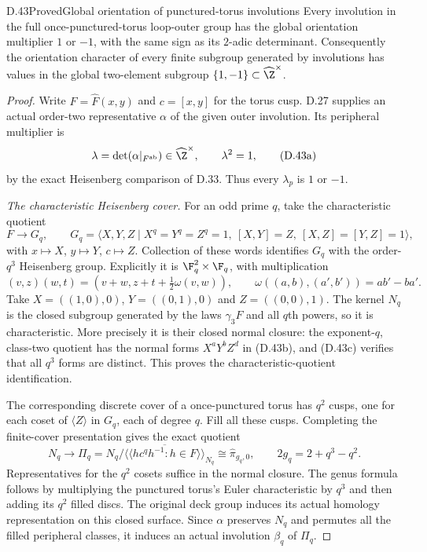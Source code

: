\begin{claim}{D.43}{Proved}{Global orientation of punctured-torus involutions}
Every involution in the full once-punctured-torus loop-outer
group has the global orientation multiplier $1$ or $-1$,
with the same sign as its $2$-adic determinant.
Consequently the orientation character of every finite
subgroup generated by involutions has values in the global
two-element subgroup $\{1,-1\}\subset\widehat\Z^\times$.
\end{claim}
\begin{proof}
Write $F=\widehat F(x,y)$ and $c=[x,y]$ for the torus
cusp.  D.27 supplies an actual order-two representative
$\alpha$ of the given outer involution.  Its peripheral
multiplier is
\[
 \lambda=\det(\alpha|_{F^{\rm ab}})\in\widehat\Z^\times,
                    \qquad \lambda^2=1,
                                                        \tag{D.43a}
\]
by the exact Heisenberg comparison of D.33.
Thus every $\lambda_p$ is $1$ or $-1$.

\emph{The characteristic Heisenberg cover.}
For an odd prime $q$, take the characteristic quotient
\[
 F\longrightarrow G_q,\qquad
 G_q=\langle X,Y,Z\mid X^q=Y^q=Z^q=1,\
              [X,Y]=Z,\ [X,Z]=[Y,Z]=1\rangle,
                                                        \tag{D.43b}
\]
with $x\mapsto X$, $y\mapsto Y$, $c\mapsto Z$.
Collection of these words identifies $G_q$ with the
order-$q^3$ Heisenberg group.  Explicitly it is
$\F_q^2\times\F_q$, with multiplication
\[
 (v,z)(w,t)=(v+w,z+t+\tfrac12\omega(v,w)),
 \qquad \omega((a,b),(a',b'))=ab'-ba'.
                                                        \tag{D.43c}
\]
Take $X=((1,0),0)$, $Y=((0,1),0)$ and $Z=((0,0),1)$.
The kernel $N_q$ is the closed subgroup generated by
the laws $\gamma_3F$ and all $q$th powers, so it is
characteristic.  More precisely it is their closed
normal closure: the exponent-$q$, class-two quotient
has the normal forms $X^aY^bZ^d$ in (D.43b), and
(D.43c) verifies that all $q^3$ forms are distinct.
This proves the characteristic-quotient identification.

The corresponding discrete cover of a once-punctured
torus has $q^2$ cusps, one for each coset of
$\langle Z\rangle$ in $G_q$, each of degree $q$.
Fill all these cusps.  Completing the finite-cover
presentation gives the exact quotient
\[
 N_q\longrightarrow
 \Pi_q=N_q/
   \overline{\langle\!\langle h c^q h^{-1}:
                       h\in F\rangle\!\rangle}_{N_q}
       \cong\widehat\pi_{g_q,0},
 \qquad 2g_q=2+q^3-q^2 .
                                                        \tag{D.43d}
\]
Representatives for the $q^2$ cosets suffice in the
normal closure.  The genus formula follows by multiplying
the punctured torus's Euler characteristic by $q^3$
and then adding its $q^2$ filled discs.
The original deck group induces its actual homology
representation on this closed surface.
Since $\alpha$ preserves $N_q$ and permutes all the
filled peripheral classes, it induces an actual
involution $\beta_q$ of $\Pi_q$.


\end{proof}
